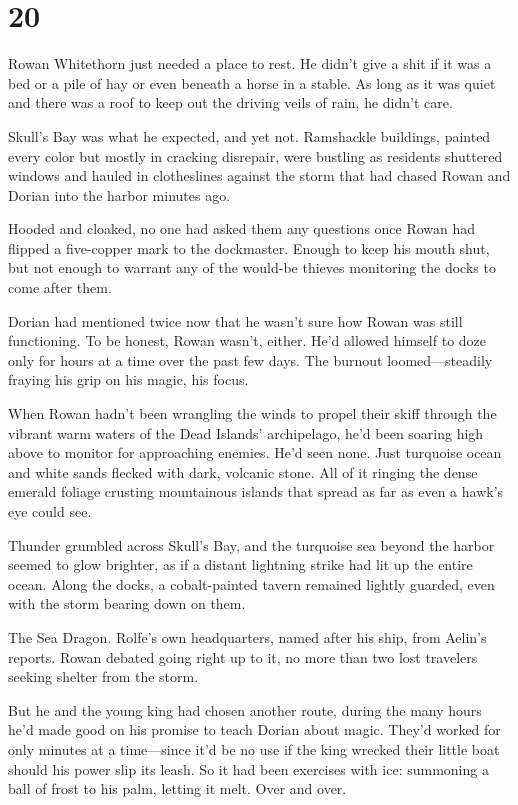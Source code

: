 
\chapter{20}

Rowan Whitethorn just needed a place to rest. He didn't give a shit if it was a bed or a pile of hay or even beneath a horse in a stable. As long as it was quiet and there was a roof to keep out the driving veils of rain, he didn't care.

Skull's Bay was what he expected, and yet not. Ramshackle buildings, painted every color but mostly in cracking disrepair, were bustling as residents shuttered windows and hauled in clotheslines against the storm that had chased Rowan and Dorian into the harbor minutes ago.

Hooded and cloaked, no one had asked them any questions once Rowan had flipped a five-copper mark to the dockmaster. Enough to keep his mouth shut, but not enough to warrant any of the would-be thieves monitoring the docks to come after them.

Dorian had mentioned twice now that he wasn't sure how Rowan was still functioning. To be honest, Rowan wasn't, either. He'd allowed himself to doze only for hours at a time over the past few days. The burnout loomed---steadily fraying his grip on his magic, his focus.

When Rowan hadn't been wrangling the winds to propel their skiff through the vibrant warm waters of the Dead Islands' archipelago, he'd been soaring high above to monitor for approaching enemies. He'd seen none. Just turquoise ocean and white sands flecked with dark, volcanic stone. All of it ringing the dense emerald foliage crusting mountainous islands that spread as far as even a hawk's eye could see.

Thunder grumbled across Skull's Bay, and the turquoise sea beyond the harbor seemed to glow brighter, as if a distant lightning strike had lit up the entire ocean. Along the docks, a cobalt-painted tavern remained lightly guarded, even with the storm bearing down on them.

The Sea Dragon. Rolfe's own headquarters, named after his ship, from Aelin's reports. Rowan debated going right up to it, no more than two lost travelers seeking shelter from the storm.

But he and the young king had chosen another route, during the many hours he'd made good on his promise to teach Dorian about magic. They'd worked for only minutes at a time---since it'd be no use if the king wrecked their little boat should his power slip its leash. So it had been exercises with ice: summoning a ball of frost to his palm, letting it melt. Over and over.

